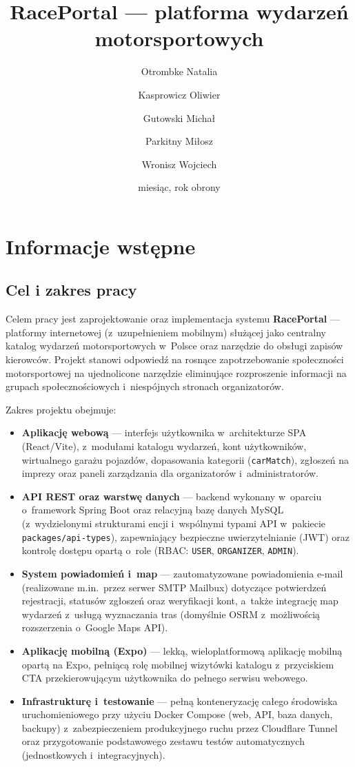 \documentclass{sprz}
\title{RacePortal --- platforma wydarzeń motorsportowych}
\author{Otrombke Natalia}{s26828}{Cyberbezpieczeństwo}{Stacjonarny}
\author{Kasprowicz Oliwier}{s30290}{Cyberbezpieczeństwo}{Stacjonarny}
\author{Gutowski Michał}{s30572}{Cyberbezpieczeństwo}{Stacjonarny}
\author{Parkitny Miłosz}{s30287}{Cyberbezpieczeństwo}{Stacjonarny}
\author{Wronisz Wojciech}{s26999}{Cyberbezpieczeństwo}{Stacjonarny}
\date{miesiąc, rok obrony} %
\begin{document}
\maketitle

\makeprojectcard

\makedeclarationsai

\tableofcontents

\chapter{Informacje wstępne}
\section{Cel i zakres pracy}
\label{sec:cel-zakres}
Celem pracy jest zaprojektowanie oraz implementacja systemu \textbf{RacePortal} --- platformy internetowej (z~uzupełnieniem mobilnym) służącej jako centralny katalog wydarzeń motorsportowych w~Polsce oraz narzędzie do obsługi zapisów kierowców. Projekt stanowi odpowiedź na rosnące zapotrzebowanie społeczności motorsportowej na ujednolicone narzędzie eliminujące rozproszenie informacji na grupach społecznościowych i~niespójnych stronach organizatorów.

Zakres projektu obejmuje:
\begin{itemize}
  \item \textbf{Aplikację webową} --- interfejs użytkownika w~architekturze SPA (React/Vite), z~modułami katalogu wydarzeń, kont użytkowników, wirtualnego garażu pojazdów, dopasowania kategorii (\texttt{carMatch}), zgłoszeń na imprezy oraz paneli zarządzania dla organizatorów i~administratorów.
  \item \textbf{API REST oraz warstwę danych} --- backend wykonany w~oparciu o~framework Spring Boot oraz relacyjną bazę danych MySQL (z~wydzielonymi strukturami encji i~wspólnymi typami API w~pakiecie \texttt{packages/api-types}), zapewniający bezpieczne uwierzytelnianie (JWT) oraz kontrolę dostępu opartą o~role (RBAC: \texttt{USER}, \texttt{ORGANIZER}, \texttt{ADMIN}).
  \item \textbf{System powiadomień i~map} --- zautomatyzowane powiadomienia e-mail (realizowane m.in.\ przez serwer SMTP Mailbux) dotyczące potwierdzeń rejestracji, statusów zgłoszeń oraz weryfikacji kont, a~także integrację map wydarzeń z~usługą wyznaczania tras (domyślnie OSRM z~możliwością rozszerzenia o~Google Maps API).
  \item \textbf{Aplikację mobilną (Expo)} --- lekką, wieloplatformową aplikację mobilną opartą na Expo, pełniącą rolę mobilnej wizytówki katalogu z~przyciskiem CTA przekierowującym użytkownika do pełnego serwisu webowego.
  \item \textbf{Infrastrukturę i~testowanie} --- pełną konteneryzację całego środowiska uruchomieniowego przy użyciu Docker Compose (web, API, baza danych, backupy) z~zabezpieczeniem produkcyjnego ruchu przez Cloudflare Tunnel oraz przygotowanie podstawowego zestawu testów automatycznych (jednostkowych i~integracyjnych).
\end{itemize}
\end{document}

